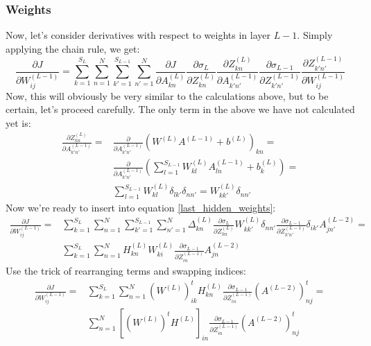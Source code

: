 \documentclass[12pt, a4paper]{article}
\numberwithin{equation}{section}
\begin{document}
\subsubsection{Weights}
Now, let's consider derivatives with respect to weights in layer $L-1$. Simply applying the chain rule, we get:
\begin{equation}
\label{last_hidden_weights}
\frac{\partial J}{\partial W^{(L-1)}_{ij}}=\sum_{k=1}^{S_L}\sum_{n=1}^N\sum_{k'=1}^{S_{L-1}}\sum_{n'=1}^N\frac{\partial J}{\partial A^{(L)}_{kn}}\frac{\partial\sigma_L}{\partial Z^{(L)}_{kn}}\frac{\partial Z^{(L)}_{kn}}{\partial A^{(L-1)}_{k'n'}}\frac{\partial\sigma_{L-1}}{\partial Z^{(L-1)}_{k'n'}}\frac{\partial Z^{(L-1)}_{k'n'}}{\partial W^{(L-1)}_{ij}}
\end{equation}
Now, this will obviously be very similar to the calculations above, but to be certain, let's proceed carefully. The only term in the above we have not calculated yet is:
\begin{align}
\frac{\partial Z^{(L)}_{kn}}{\partial A^{(L-1)}_{k'n'}}=&\frac{\partial}{\partial A^{(L-1)}_{k'n'}}\left(W^{(L)}A^{(L-1)}+b^{(L)}\right)_{kn}=\\
&\frac{\partial}{\partial A^{(L-1)}_{k'n'}}\left(\sum_{l=1}^{S_{L-1}}W^{(L)}_{kl}A^{(L-1)}_{ln}+b^{(L)}_k\right)=\\
&\sum_{l=1}^{S_{L-1}}W^{(L)}_{kl}\delta_{lk'}\delta_{nn'}=W^{(L)}_{kk'}\delta_{nn'}
\end{align}
Now we're ready to insert into equation \ref{last_hidden_weights}:
\begin{align}
\frac{\partial J}{\partial W^{(L-1)}_{ij}}=&\sum_{k=1}^{S_L}\sum_{n=1}^N\sum_{k'=1}^{S_{L-1}}\sum_{n'=1}^N\Delta^{(L)}_{kn}\frac{\partial\sigma_L}{\partial Z^{(L)}_{kn}}W^{(L)}_{kk'}\delta_{nn'}\frac{\partial\sigma_{L-1}}{\partial Z^{(L-1)}_{k'n'}}\delta_{ik'}A^{(L-2)}_{jn'}=\\
&\sum_{k=1}^{S_L}\sum_{n=1}^N H^{(L)}_{kn}W^{(L)}_{ki}\frac{\partial\sigma_{L-1}}{\partial Z^{(L-1)}_{in}}A^{(L-2)}_{jn}
\end{align}
Use the trick of rearranging terms and swapping indices:
\begin{align}
\frac{\partial J}{\partial W^{(L-1)}_{ij}}=&\sum_{k=1}^{S_L}\sum_{n=1}^N\left(W^{(L)}\right)^t_{ik}H^{(L)}_{kn}\frac{\partial\sigma_{L-1}}{\partial Z^{(L-1)}_{in}}\left(A^{(L-2)}\right)^t_{nj}=\\
&\sum_{n=1}^N\left[\left(W^{(L)}\right)^t H^{(L)}\right]_{in}\frac{\partial\sigma_{L-1}}{\partial Z^{(L-1)}_{in}}\left(A^{(L-2)}\right)^t_{nj}
\end{align}
\end{document}
